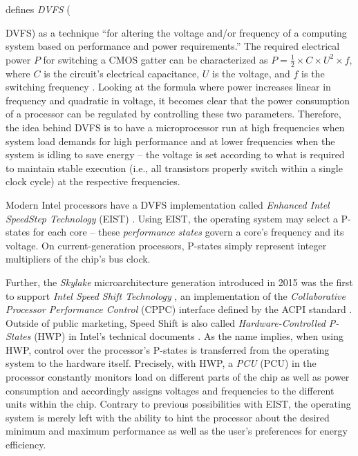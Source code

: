 \citeauthor{mittal2014survey} \cite{mittal2014survey} defines \textit{\acrlong{DVFS}} ({\acrshort{DVFS}) as a technique \enquote{for altering the voltage and/or frequency of a computing system based on performance and power requirements.} The required electrical power $P$ for switching a \gls{CMOS} gatter can be characterized as $P=\frac{1}{2} \times C \times U^2 \times f$, where $C$ is the circuit's electrical capacitance, $U$ is the voltage, and $f$ is the switching frequency \cite{Hennessy:2017:CAS:3207796}. Looking at the formula where power increases linear in frequency and quadratic in voltage, it becomes clear that the power consumption of a processor can be regulated by controlling these two parameters. Therefore, the idea behind \gls{DVFS} is to have a microprocessor run at high frequencies when system load demands for high performance and at lower frequencies when the system is idling to save energy -- the voltage is set according to what is required to maintain stable execution (i.e., all transistors properly switch within a single clock cycle) at the respective frequencies.

Modern Intel processors have a \gls{DVFS} implementation called \emph{Enhanced Intel SpeedStep Technology} (EIST) \cite{intelsdmsysprogguide}. Using EIST, the operating system may select a \glspl{P-state} for each core -- these \emph{performance states} govern a core's frequency and its voltage. On current-generation processors, \glspl{P-state} simply represent integer multipliers of the chip's bus clock.

Further, the \textit{Skylake} microarchitecture generation introduced in 2015 was the first to support \emph{Intel Speed Shift Technology} \cite{intelsykalekannouncement}, an implementation of the \emph{Collaborative Processor Performance Control} (CPPC) interface defined by the \gls{ACPI} standard \cite{acpispec}. Outside of public marketing, Speed Shift is also called \emph{Hardware-Controlled P-States} (HWP) in Intel's technical documents \cite{intelsdmsysprogguide}. As the name implies, when using HWP, control over the processor's \glspl{P-state} is transferred from the operating system to the hardware itself. Precisely, with \gls{HWP}, a \textit{\acrlong{PCU}} (\acrshort{PCU}) in the processor constantly monitors load on different parts of the chip as well as power consumption and accordingly assigns voltages and frequencies to the different units within the chip. Contrary to previous possibilities with EIST, the operating system is merely left with the ability to hint the processor about the desired minimum and maximum performance as well as the user's preferences for energy efficiency.

}
